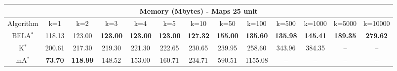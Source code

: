 \begin{tabular}{c|cccccccccccc}\toprule
\multicolumn{13}{c}{Memory (Mbytes) - Maps 25 unit}\\ \midrule
Algorithm & k=1 & k=2 & k=3 & k=4 & k=5 & k=10 & k=50 & k=100 & k=500 & k=1000 & k=5000 & k=10000 \\ \midrule
BELA$^*$ & 118.13 & 123.00 & \textbf{123.00} & \textbf{123.00} & \textbf{123.00} & \textbf{127.32} & \textbf{155.00} & \textbf{135.60} & \textbf{135.98} & \textbf{145.41} & \textbf{189.35} & \textbf{279.62} \\
K$^*$ & 200.61 & 217.30 & 219.30 & 221.30 & 222.65 & 230.65 & 239.95 & 258.60 & 343.96 & 384.35 & -- & -- \\
mA$^*$ & \textbf{73.70} & \textbf{118.99} & 148.52 & 153.00 & 160.71 & 234.71 & 590.51 & 1155.08 & -- & -- & -- & -- \\ \bottomrule 
\end{tabular}
